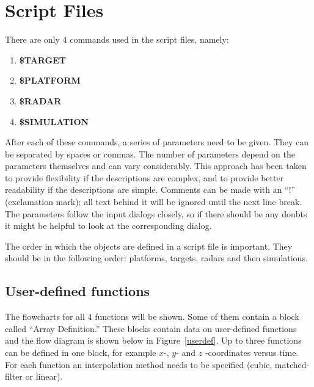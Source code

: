                       

\chapter{Script Files\label{chapter:script}}

There are only $4$ commands used in the script files, namely:

\begin{enumerate}
\item  \textbf{\$TARGET}

\item  \textbf{\$PLATFORM}

\item  \textbf{\$RADAR}

\item  \textbf{\$SIMULATION}
\end{enumerate}

After each of these commands, a series of parameters need to be given. They
can be separated by spaces or commas. The number of parameters depend on the
parameters themselves and can vary considerably. This approach has been
taken to provide flexibility if the descriptions are complex, and to provide
better readability if the descriptions are simple. Comments can be made with
an ``!'' (exclamation mark); all text behind it will be ignored until the
next line break. The parameters follow the input dialogs closely, so if
there should be any doubts it might be helpful to look at the corresponding
dialog.

The order in which the objects are defined in a script file is important.
They should be in the following order: platforms, targets, radars and then
simulations.

\section{User-defined functions}

The flowcharts for all $4$ functions will be shown. Some of them contain a
block called ``Array Definition.'' These blocks contain data on user-defined
functions and the flow diagram is shown below in Figure~\ref{userdef}. Up to
three functions can be defined in one block, for example $x$-, $y$- and $z$%
-coordinates versus time. For each function an interpolation method needs to
be specified (cubic, matched-filter or linear).


